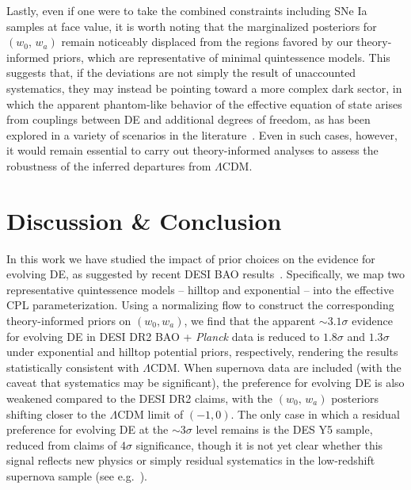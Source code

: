 Lastly, even if one were to take the combined constraints including SNe Ia samples at face value, it is worth noting that the marginalized posteriors for $(w_0,\,w_a)$ remain noticeably displaced from the regions favored by our theory-informed priors, which are representative of minimal quintessence models. This suggests that, if the deviations are not simply the result of unaccounted systematics, they may instead be pointing toward a more complex dark sector, in which the apparent phantom-like behavior of the effective equation of state arises from couplings between DE and additional degrees of freedom, as has been explored in a variety of scenarios in the literature~\cite{Ye:2024ywg,Chakraborty:2024xas,Wang:2024hks,Giare:2024smz,Li:2024qso,Aboubrahim:2024cyk,Pan:2025psn,Cai:2025mas, Wolf:2024stt,Ye:2024zpk,Tiwari:2024gzo,Chakraborty:2025syu,Khoury:2025txd,Wolf:2025jed,Bedroya:2025fwh,Brax:2025ahm, Li:2025owk,Sabogal:2025mkp,Tsedrik:2025cwc,Zhai:2025hfi,Shah:2025ayl,Silva:2025hxw,Pan:2025qwy,Yashiki:2025loj,Barman:2025ryg,Li:2025ula, Wang:2025znm,Petri:2025swg, vanderWesthuizen:2025rip}. Even in such cases, however, it would remain essential to carry out theory-informed analyses to assess the robustness of the inferred departures from $\Lambda$CDM.



\section{Discussion \& Conclusion}\label{sec:ch11-DNC}


\noindent In this work we have studied the impact of prior choices on the evidence for evolving DE, as suggested by recent DESI BAO results~\cite{DESI:2024mwx,DESI:2025zgx}. Specifically, we map two representative quintessence models -- hilltop and exponential -- into the effective CPL parameterization. Using a normalizing flow  to construct the corresponding theory-informed priors on $(w_0,w_a)$, we find that the apparent $\sim 3.1\sigma$ evidence for evolving DE in DESI DR2 BAO + \textit{Planck} data is reduced to $1.8\sigma$ and $1.3\sigma$ under exponential and hilltop potential priors, respectively, rendering the results statistically consistent with $\Lambda$CDM. When supernova data are included (with the caveat that systematics may be significant), the preference for evolving DE is also weakened compared to the DESI DR2 claims, with the $(w_0,\,w_a)$ posteriors shifting closer to the $\Lambda$CDM limit of $(-1,0)$. The only case in which  a residual preference for evolving DE at the $\sim 3\sigma$ level remains is the DES Y5 sample, reduced from claims of 4$\sigma$ significance, though it is not yet clear whether this signal reflects new physics  or simply residual systematics in the low-redshift supernova sample (see e.g.~\cite{Efstathiou:2024xcq,Notari:2024zmi,DES:2025tir, Cortes:2025joz}).

